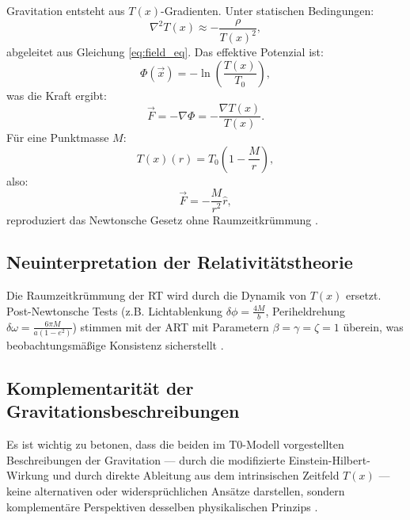 \documentclass[12pt,a4paper]{article}
\newcommand{\Tfield}{T(x)}
\newcommand{\Tzero}{T_0}
\newcommand{\vecx}{\vec{x}}
\begin{document}
	Gravitation entsteht aus \(\Tfield\)-Gradienten. Unter statischen Bedingungen:
	\begin{equation}
		\nabla^2\Tfield \approx -\frac{\rho}{\Tfield^2},
		\label{eq:static_field}
	\end{equation}
	abgeleitet aus Gleichung \ref{eq:field_eq}. Das effektive Potenzial ist:
	\begin{equation}
		\Phi(\vecx) = -\ln\left(\frac{\Tfield}{\Tzero}\right),
		\label{eq:grav_potential_def}
	\end{equation}
	was die Kraft ergibt:
	\begin{equation}
		\vec{F} = -\nabla\Phi = -\frac{\nabla\Tfield}{\Tfield}.
		\label{eq:force_from_potential}
	\end{equation}
	Für eine Punktmasse \(M\):
	\begin{equation}
		\Tfield(r) = \Tzero\left(1 - \frac{M}{r}\right),
		\label{eq:time_field_point_mass}
	\end{equation}
	also:
	\begin{equation}
		\vec{F} = -\frac{M}{r^2} \hat{r},
		\label{eq:newton_law}
	\end{equation}
	reproduziert das Newtonsche Gesetz ohne Raumzeitkrümmung \cite{pascher_emergente_2025}.
	
	\subsection{Neuinterpretation der Relativitätstheorie}
	\label{subsec:rt_reinterpretation}
	
	Die Raumzeitkrümmung der RT wird durch die Dynamik von \(\Tfield\) ersetzt. Post-Newtonsche Tests (z.B. Lichtablenkung \(\delta\phi = \frac{4M}{b}\), Periheldrehung \(\delta\omega = \frac{6\pi M}{a(1-e^2)}\)) stimmen mit der ART mit Parametern \(\beta = \gamma = \zeta = 1\) überein, was beobachtungsmäßige Konsistenz sicherstellt \cite{Will2014}.
	
	\subsection{Komplementarität der Gravitationsbeschreibungen}
	\label{subsec:grav_complementarity}
	
	Es ist wichtig zu betonen, dass die beiden im T0-Modell vorgestellten Beschreibungen der Gravitation — durch die modifizierte Einstein-Hilbert-Wirkung und durch direkte Ableitung aus dem intrinsischen Zeitfeld $\Tfield$ — keine alternativen oder widersprüchlichen Ansätze darstellen, sondern komplementäre Perspektiven desselben physikalischen Prinzips \cite{pascher_emergente_2025}.
	
\end{document}
